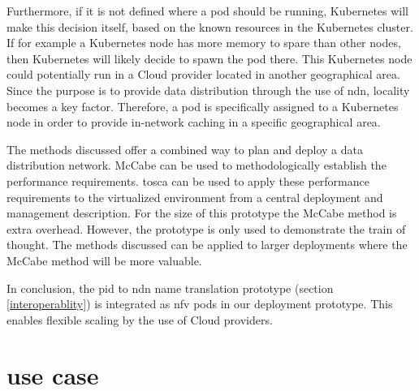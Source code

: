 \documentclass[conference]{IEEEtran}
\begin{document}
Furthermore, if it is not defined where a pod should be running, Kubernetes will make this decision itself, based on the known resources in the Kubernetes cluster. If for example a Kubernetes node has more memory to spare than other nodes, then Kubernetes will likely decide to spawn the pod there. This Kubernetes node could potentially run in a Cloud provider located in another geographical area. Since the purpose is to provide data distribution through the use of \gls{ndn}, locality becomes a key factor. Therefore, a pod is specifically assigned to a Kubernetes node in order to provide in-network caching in a specific geographical area.

The methods discussed offer a combined way to plan and deploy a data distribution network. McCabe can be used to methodologically establish the performance requirements. \gls{tosca} can be used to apply these performance requirements to the virtualized environment from a central deployment and management description. For the size of this prototype the McCabe method is extra overhead. However, the prototype is only used to demonstrate the train of thought. The methods discussed can be applied to larger deployments where the McCabe method will be more valuable.

In conclusion, the \gls{pid} to \gls{ndn} name translation prototype (section \ref{interoperablity}) is integrated as \gls{nfv} pods in our deployment prototype. This enables flexible scaling by the use of Cloud providers.

\section{use case}
\end{document}
